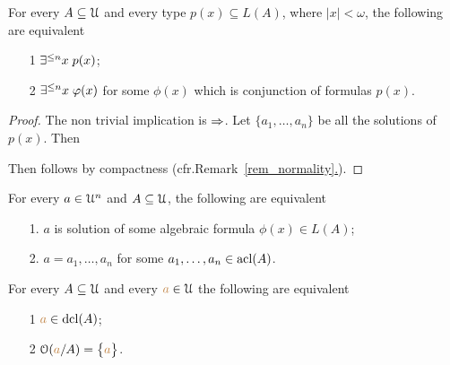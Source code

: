 \begin{proposition}\label{prop_tipialgebrici}
For every $A\subseteq\EuScript U$ and every type $p(x)\subseteq L(A)$, where $|x|<\omega$, the following are equivalent
\begin{itemize} 
\item[1] $\exists^{\le n}x\; p(x)$;
\item[2] $\exists^{\le n}x\;\varphi(x)$ for some $\phi(x)$ which is conjunction of formulas $p(x)$.
\end{itemize}
\end{proposition}
\begin{proof} The non trivial implication is $\Rightarrow$.
Let $\{a_1,\dots,a_n\}$ be all the solutions of $p(x)$.
Then 


Then  follows by compactness (cfr.\@ Remark~\hyperref[rem_normality]{\ref*{rem_normality}.}).
% 
% 
% 
% 
\end{proof}




\begin{exercise}
For every $a\in\EuScript U^n$ and $A\subseteq\EuScript U$, the following are equivalent
\begin{itemize}
\item[1.] $a$ is solution of some algebraic formula  $\phi(x)\in L(A)$;
\item[2.] $a=a_1,\dots,a_n$ for some $a_1,\dots,a_n\in\mathop{\rm acl}(A)$.\QED 
\end{itemize}
\end{exercise}


\begin{theorem}\label{thm_dgalois}
For every $A\subseteq\EuScript U$ and every ${\color{brown} a}\in\EuScript U$ the following are equivalent
\begin{itemize}
\item[1] ${\color{brown} a}\in\mathop{\rm dcl}(A)$;
\item[2] $\EuScript O({\color{brown} a}/A)=\big\{{\color{brown} a}\big\}$.
\end{itemize}
\end{theorem}

